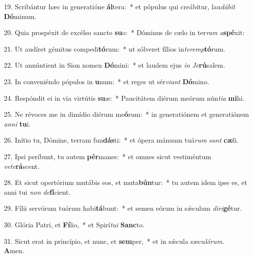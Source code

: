 19. Scribántur hæc in generatióne \textbf{ál}tera:~*  et pópulus qui creábitur, lau\textit{dá}\textit{bit} \textbf{Dó}minum.\

20. Quia prospéxit de excélso sancto \textbf{su}o:~*  Dóminus de cælo in ter\textit{ram} \textit{a}\textbf{spé}xit:\

21. Ut audíret gémitus compedi\textbf{tó}rum:~*  ut sólveret fílios in\textit{ter}\textit{emp}\textbf{tó}rum.\

22. Ut annúntient in Sion nomen \textbf{Dó}mini:~*  et laudem ejus \textit{in} \textit{Je}\textbf{rú}salem.\

23. In conveniéndo pópulos in \textbf{u}num:~*  et reges ut sér\textit{vi}\textit{ant} \textbf{Dó}mino.\

24. Respóndit ei in via virtútis \textbf{su}æ:~*  Paucitátem diérum meórum nún\textit{ti}\textit{a} \textbf{mi}hi.\

25. Ne révoces me in dimídio diérum me\textbf{ó}rum:~*  in generatiónem et generatiónem \textit{an}\textit{ni} \textbf{tu}i.\

26. Inítio tu, Dómine, terram fun\textbf{dás}ti:~*  et ópera mánuum tuá\textit{rum} \textit{sunt} \textbf{cæ}li.\

27. Ipsi períbunt, tu autem \textbf{pér}manes:~*  et omnes sicut vestiméntum \textit{ve}\textit{te}\textbf{rá}scent.\

28. Et sicut opertórium mutábis eos, et muta\textbf{bún}tur:~*  tu autem idem ipse es, et anni tui \textit{non} \textit{de}\textbf{fí}cient.\

29. Fílii servórum tuórum habi\textbf{tá}bunt:~*  et semen eórum in sǽculum \textit{di}\textit{ri}\textbf{gé}tur.\

30. Glória Patri, et \textbf{Fí}lio,~*  et Spirí\textit{tu}\textit{i} \textbf{Sanc}to.\

31. Sicut erat in princípio, et nunc, et \textbf{sem}per,~*  et in sǽcula sæcu\textit{ló}\textit{rum}. \textbf{A}men.\

